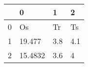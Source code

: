 \begin{tabular}{llll}
\toprule
{} &        0 &    1 &    2 \\
\midrule
0 &       Os &   Tr &   Ts \\
1 &   19.477 &  3.8 &  4.1 \\
2 &  15.4832 &  3.6 &    4 \\
\bottomrule
\end{tabular}
